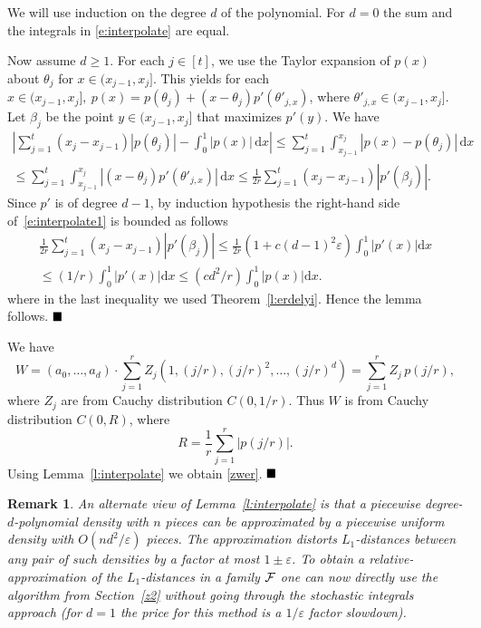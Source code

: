 \documentclass[11pt]{article}
\def\eps{\varepsilon}
\newtheorem{rem}[thm]{Remark}
\newenvironment{prf}[1]{\noindent{\bf{Proof #1\\}}}{$\hfill\blacksquare$\nopagebreak[4]\vskip 0.3cm}
\newcommand\BPRF[1][:]{\begin{prf}{#1}}
\def\EPRF{\end{prf}}
\def\BREM{\begin{rem}\rm}
\def\EREM{\end{rem}}
\begin{document}
\BPRF
We will use induction on the degree $d$ of the polynomial. For $d=0$ the sum and the integrals in \eqref{e:interpolate}
are equal.

Now assume $d\geq 1$. For each $j \in [t]$, we use the Taylor expansion of $p(x)$ about $\theta_j$ for
$x \in (x_{j-1}, x_{j}]$. This yields for each $x \in(x_{j-1}, x_j], ~
p(x) = p(\theta_j) + (x - \theta_j) p'(\theta'_{j,x})$, where $\theta'_{j,x} \in (x_{j-1}, x_j]$.
Let $\beta_j$ be the point $y\in (x_{j-1}, x_{j}]$ that maximizes $p'(y)$. We have
\begin{equation}\label{e:interpolate1}
\begin{split}
\left | \sum_{j=1}^{t} (x_j - x_{j-1}) | p(\theta_j) | - \int_0^1 | p(x) | \,\mbox{d} x
\right | \leq  \sum_{j=1}^{t} \int_{x_{j-1}}^{x_j} | p(x) - p(\theta_j) | \,\mbox{d} x\\
\leq \sum_{j=1}^{t} \int_{x_{j-1}}^{x_j} | (x - \theta_j) p'(\theta'_{j,x}) | \,\mbox{d} x
\leq \frac{1}{2r} \sum_{j=1}^{t} (x_j - x_{j-1}) |p'(\beta_{j})|.
\end{split}
\end{equation}
Since $p'$ is of degree $d - 1$, by induction hypothesis the right-hand side of~\eqref{e:interpolate1}
is bounded as follows
\begin{equation*}
\begin{split}
\frac{1}{2r} \sum_{j=1}^{t} (x_j - x_{j-1}) |p'(\beta_{j})|\leq
\frac{1}{2r} (1 + c(d-1)^2\eps) \int_{0}^{1} | p'(x) | \mbox{d} x \\
\leq (1/r) \int_{0}^{1} | p'(x) | \mbox{d} x \leq (cd^2/r) \int_{0}^{1} | p(x) | \mbox{d} x.
\end{split}
\end{equation*}
where in the last inequality we used Theorem~\ref{l:erdelyi}. Hence the lemma follows.
\EPRF

\BPRF[of Lemma~\ref{lesa}:]
We have
$$
W=(a_0,\dots,a_d)\cdot \sum_{j=1}^r Z_j (1,(j/r),(j/r)^2,\dots,(j/r)^d)=\sum_{j=1}^r Z_j\, p(j/r),
$$
where $Z_j$ are from Cauchy distribution $C(0,1/r)$. Thus $W$ is from Cauchy distribution $C(0,R)$, where
$$
R=\frac{1}{r}\sum_{j=1}^r |p(j/r)|.
$$
Using Lemma~\ref{l:interpolate} we obtain \eqref{zwer}.
\EPRF

\BREM
An alternate view of Lemma~\ref{l:interpolate} is that a piecewise degree-$d$-polynomial
density with $n$ pieces can be approximated by a piecewise uniform density with
$O(nd^2/\eps)$ pieces. The approximation distorts $L_1$-distances between any pair
of such densities by a factor at most $1\pm\eps$. To obtain a relative-approximation
of the $L_1$-distances in a family ${\cal F}$ one can now directly use the algorithm from Section~\ref{z2} without
going through the stochastic integrals approach (for $d=1$ the price for this
method is a $1/\eps$ factor slowdown).
\EREM
\end{document}
